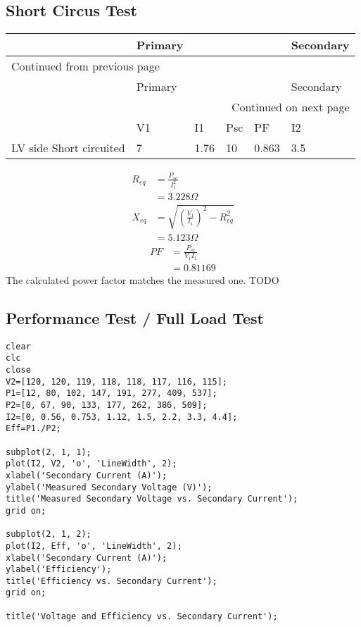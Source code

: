 \documentclass[11pt]{article}
\begin{document}
\subsection{Short Circus Test}
\label{sec:orgead4bfe}
\begin{longtable}{|l|l|l|l|l|l|}
\hline
 & Primary &  &  &  & Secondary\\
\hline
\endfirsthead
\multicolumn{6}{l}{Continued from previous page} \\
\hline

 & Primary &  &  &  & Secondary \\

\hline
\endhead
\hline\multicolumn{6}{r}{Continued on next page} \\
\endfoot
\endlastfoot
\hline
 & V1 & I1 & Psc & PF & I2\\
\hline
LV side Short circuited & 7 & 1.76 & 10 & 0.863 & 3.5\\
\hline
\end{longtable}
\begin{align*}
R_{eq}&=\frac{P_{sc}}{I_1^2} \\
&=3.228\Omega \\
X_{eq}&=\sqrt{\left(\frac{V_1}{I_1}\right)^2-R_{eq}^{2}} \\
&=5.123\Omega
\end{align*}
\begin{align*}
PF&=\frac{P_{sc}}{V_1I_1} \\
&=0.81169
\end{align*}
The calculated power factor matches the measured one.
TODO
\subsection{Performance Test / Full Load Test}
\label{sec:org6a44ff2}
\begin{verbatim}
clear
clc
close
V2=[120, 120, 119, 118, 118, 117, 116, 115];
P1=[12, 80, 102, 147, 191, 277, 409, 537];
P2=[0, 67, 90, 133, 177, 262, 386, 509];
I2=[0, 0.56, 0.753, 1.12, 1.5, 2.2, 3.3, 4.4];
Eff=P1./P2;

subplot(2, 1, 1);
plot(I2, V2, 'o', 'LineWidth', 2);
xlabel('Secondary Current (A)');
ylabel('Measured Secondary Voltage (V)');
title('Measured Secondary Voltage vs. Secondary Current');
grid on;

subplot(2, 1, 2);
plot(I2, Eff, 'o', 'LineWidth', 2);
xlabel('Secondary Current (A)');
ylabel('Efficiency');
title('Efficiency vs. Secondary Current');
grid on;

title('Voltage and Efficiency vs. Secondary Current');
\end{verbatim}
\end{document}
